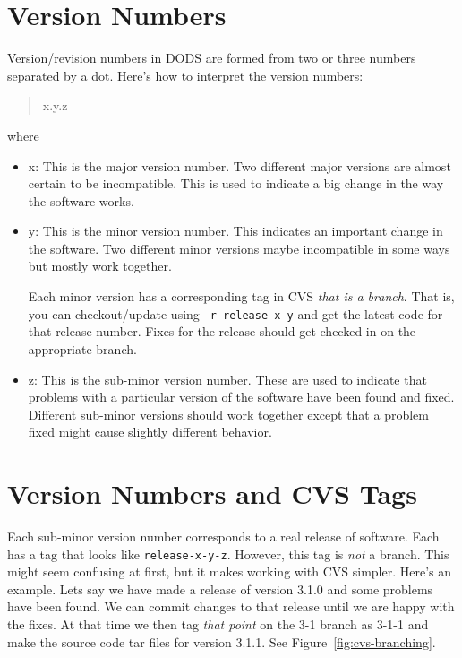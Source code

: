 \documentclass{dods-paper}
\begin{document}
\T\appendix

\section{Version Numbers}
\label{version-numbers}

Version/revision numbers in DODS are formed from two or three numbers
separated by a dot. Here's how to interpret the version numbers:
\begin{quote}
  x.y.z
\end{quote}

where 
\begin{itemize}
\item x: This is the major version number. Two different major versions are
  almost certain to be incompatible. This is used to indicate a big
  change in the way the software works.

\item y: This is the minor version number. This indicates an important change
  in the software. Two different minor versions maybe incompatible in some
  ways but mostly work together.

  Each minor version has a corresponding tag in CVS {\em that is a branch}.
    That is, you can checkout/update using \texttt{-r release-x-y} and get
    the latest code for that  release number. Fixes for the
    release should get checked in on the appropriate branch.

\item z: This is the sub-minor version number. These are used to indicate
  that problems with a particular version of the software have been
  found and fixed. Different sub-minor versions should work together
  except that a problem fixed might cause slightly different behavior.
\end{itemize}

\section{Version Numbers and CVS Tags}

Each sub-minor version number corresponds to a real release of software.
Each has a tag that looks like \texttt{release-x-y-z}. However, this tag is
{\em not} a branch. This might seem confusing at first, but it makes
working with CVS simpler. Here's an example. Lets say we have made a
release of version 3.1.0 and some problems have been found. We can commit
changes to that release until we are happy with the fixes. At that time we
then tag {\em that point} on the 3-1 branch as 3-1-1 and make the source
code tar files for version 3.1.1. See Figure~\ref{fig:cvs-branching}.
\end{document}
